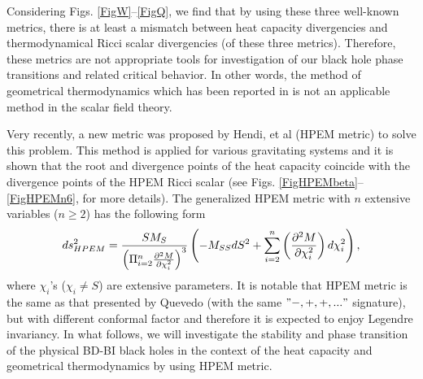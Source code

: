 \documentclass[aps,onecolumn ]{revtex4}
\begin{document}
Considering Figs. \ref{FigW}--\ref{FigQ}, we find that by using
these three well-known metrics, there is at least a mismatch
between heat capacity divergencies and thermodynamical Ricci
scalar divergencies (of these three metrics). Therefore, these
metrics are not appropriate tools for investigation of our black
hole phase transitions and related critical behavior. In other
words, the method of geometrical thermodynamics which has been
reported in \cite{Niu} is not an applicable method in the scalar
field theory.

Very recently, a new metric was proposed by Hendi, et al (HPEM
metric) to solve this problem. This method is applied for various
gravitating systems and it is shown that the root and divergence
points of the heat capacity coincide with the divergence points of
the HPEM Ricci scalar (see Figs.
\ref{FigHPEMbeta}--\ref{FigHPEMn6}, for more details). The
generalized HPEM metric with $n$ extensive variables ($n\geq 2$)
has the following form \cite{HPEM1,HPEM2,HPEM3}
\begin{equation}
ds_{HPEM}^{2}=\frac{SM_{S}}{\left( \Pi _{i=2}^{n}\frac{\partial ^{2}M}{%
\partial \chi _{i}^{2}}\right) ^{3}}\left(
-M_{SS}dS^{2}+\sum_{i=2}^{n}\left( \frac{\partial ^{2}M}{\partial \chi
_{i}^{2}}\right) d\chi _{i}^{2}\right),  \label{HPEM}
\end{equation}
where $\chi_{i}$'s ($\chi_{i}\neq S$) are extensive parameters. It is
notable that HPEM metric is the same as that presented by Quevedo (with the
same $"-,+,+,..."$ signature), but with different conformal factor and
therefore it is expected to enjoy Legendre invariancy. In what follows, we
will investigate the stability and phase transition of the physical BD-BI
black holes in the context of the heat capacity and geometrical
thermodynamics by using HPEM metric.
\end{document}
